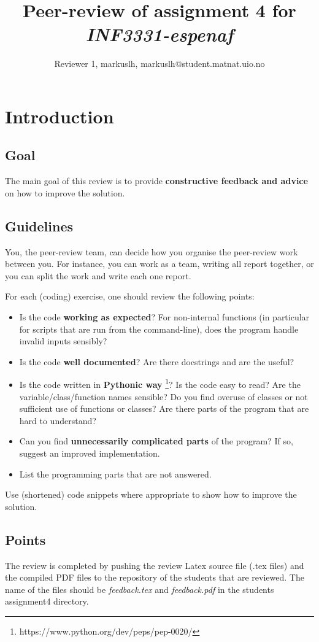 \documentclass[a4paper]{article}
\title{Peer-review of assignment 4 for \textit{INF3331-espenaf}}
\author{Reviewer 1, markuslh, {markuslh@student.matnat.uio.no}}
\begin{document}
\maketitle

\section{Introduction}
\subsection{Goal}
The main goal of this review is to provide \textbf{constructive feedback and advice} on how to improve the solution. 

\subsection{Guidelines}\label{sec:general_review}
You, the peer-review team, can decide how you organise the peer-review work between you. For instance, you can work as a team, writing all report together, or you can split the work and write each one report. 

For each (coding) exercise, one should review the following points:

\begin{itemize}
  \item Is the code \textbf{working as expected}? For non-internal functions (in particular for scripts that are run from the command-line), does the program handle invalid inputs sensibly?
  \item Is the code \textbf{well documented}? Are there docstrings and are the useful?
  \item Is the code written in \textbf{Pythonic way} \footnote{https://www.python.org/dev/peps/pep-0020/}? Is the code easy to read? Are the variable/class/function names sensible? Do you find overuse of classes or not sufficient use of functions or classes? Are there parts of the program that are hard to understand? 
  \item Can you find \textbf{unnecessarily complicated parts} of the program? If so, suggest an improved implementation.
  \item List the programming parts that are not answered.
\end{itemize}
Use (shortened) code snippets where appropriate to show how to improve the solution. 

\subsection{Points}
The review is completed by pushing the review Latex source file (.tex files) and the compiled PDF files to the repository of the students that are reviewed. The name of the files should be \emph{feedback.tex} and \emph{feedback.pdf} in the students assignment4 directory.
\end{document}
